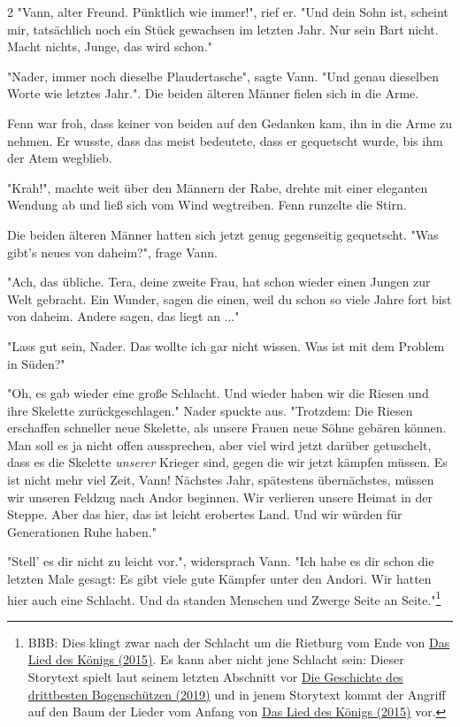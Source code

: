 \documentclass[10pt, a4paper, oneside]{book}
\begin{document}
\begin{multicols}{2}
"Vann, alter Freund. Pünktlich wie immer!", rief er. "Und dein Sohn ist, scheint mir, tatsächlich noch ein Stück gewachsen im letzten Jahr. Nur sein Bart nicht. Macht nichts, Junge, das wird schon."

"Nader, immer noch dieselbe Plaudertasche", sagte Vann. "Und genau dieselben Worte wie letztes Jahr.". Die beiden älteren Männer fielen sich in die Arme.

Fenn war froh, dass keiner von beiden auf den Gedanken kam, ihn in die Arme zu nehmen. Er wusste, dass das meist bedeutete, dass er gequetscht wurde, bis ihm der Atem wegblieb.

"Krah!", machte weit über den Männern der Rabe, drehte mit einer eleganten Wendung ab und ließ sich vom Wind wegtreiben. Fenn runzelte die Stirn.

Die beiden älteren Männer hatten sich jetzt genug gegenseitig gequetscht. "Was gibt's neues von daheim?", frage Vann.

"Ach, das übliche. Tera, deine zweite Frau, hat schon wieder einen Jungen zur Welt gebracht. Ein Wunder, sagen die einen, weil du schon so viele Jahre fort bist von daheim. Andere sagen, das liegt an ..."

"Lass gut sein, Nader. Das wollte ich gar nicht wissen. Was ist mit dem Problem in Süden?"

"Oh, es gab wieder eine große Schlacht. Und wieder haben wir die Riesen und ihre Skelette zurückgeschlagen." Nader spuckte aus. "Trotzdem: Die Riesen erschaffen schneller neue Skelette, als unsere Frauen neue Söhne gebären können. Man soll es ja nicht offen aussprechen, aber viel wird jetzt darüber getuschelt, dass es die Skelette \textit{unserer} Krieger sind, gegen die wir jetzt kämpfen müssen. Es ist nicht mehr viel Zeit, Vann! Nächstes Jahr, spätestens übernächstes, müssen wir unseren Feldzug nach Andor beginnen. Wir verlieren unsere Heimat in der Steppe. Aber das hier, das ist leicht erobertes Land. Und wir würden für Generationen Ruhe haben."

"Stell' es dir nicht zu leicht vor.", widersprach Vann. "Ich habe es dir schon die letzten Male gesagt: Es gibt viele gute Kämpfer unter den Andori. Wir hatten hier auch eine Schlacht. Und da standen Menschen und Zwerge Seite an Seite."\footnote{BBB: Dies klingt zwar nach der Schlacht um die Rietburg vom Ende von \hyperref[produkt-2015-das-lied-des-koenigs]{Das Lied des Königs (2015)}. Es kann aber nicht jene Schlacht sein: Dieser Storytext spielt laut seinem letzten Abschnitt vor \hyperref[storytext-2019-die-geschichte-des-drittbesten-bogenschuetzen]{Die Geschichte des drittbesten Bogenschützen (2019)} und in jenem Storytext kommt der Angriff auf den Baum der Lieder vom Anfang von \hyperref[produkt-2015-das-lied-des-koenigs]{Das Lied des Königs (2015)} vor.}


\end{multicols}
\end{document}
